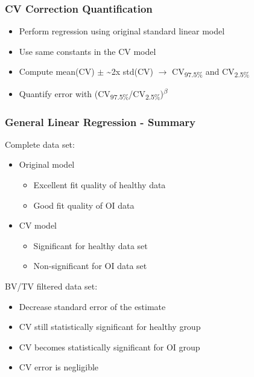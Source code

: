 \documentclass[xcolor=table]{beamer}
\begin{document}
\begin{frame}
	\frametitle{CV Correction Quantification}
	\begin{itemize}
		\item Perform regression using original standard linear model
		\item Use same constants in the CV model
		\item Compute mean(CV) $\pm$ \textasciitilde 2x std(CV) $\rightarrow$ CV\textsubscript{97.5\%} and CV\textsubscript{2.5\%}
		\item Quantify error with (CV\textsubscript{97.5\%}/CV\textsubscript{2.5\%})\textsuperscript{$\beta$}
	\end{itemize}
	
	\begin{table}[h!]\caption{CV error correction}
	\end{table}
\end{frame}




\begin{frame}
	\frametitle{General Linear Regression - Summary}
	Complete data set:
	\begin{itemize}
		\item Original model
		\begin{itemize}
			\item Excellent fit quality of healthy data
			\item Good fit quality of OI data
		\end{itemize} 
		\item CV model
		\begin{itemize}
			\item Significant for healthy data set
			\item Non-significant for OI data set
		\end{itemize}
	\end{itemize}
	\vspace{0.25cm}
	BV/TV filtered data set:
	\begin{itemize}
		\item Decrease standard error of the estimate
		\item CV still statistically significant for healthy group
		\item CV becomes statistically significant for OI group
		\item CV error is negligible
	\end{itemize}

\end{frame}
\end{document}
